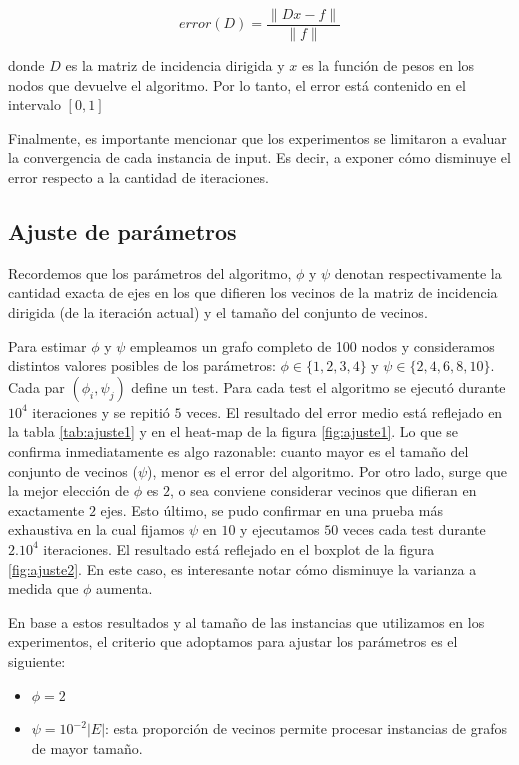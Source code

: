 \documentclass[conference,compsoc,a4paper]{IEEEtran}
\begin{document}
$$error(D) = \frac{\|Dx-f\|}{\|f\|}$$

donde $D$ es la matriz de incidencia dirigida y $x$ es la función de 
pesos en los nodos que devuelve el algoritmo. Por lo tanto, el error 
está contenido en el intervalo $[0,1]$

\smallskip

Finalmente, es importante mencionar que los experimentos se limitaron a 
evaluar la convergencia de cada instancia de input. Es decir, a exponer 
cómo disminuye el error respecto a la cantidad de iteraciones.

\subsection{Ajuste de parámetros}

Recordemos que los parámetros del algoritmo, $\phi$ y $\psi$ denotan 
respectivamente la cantidad exacta de ejes en los que difieren los 
vecinos de la matriz de incidencia dirigida (de la iteración actual) y 
el tamaño del conjunto de vecinos.

\smallskip

Para estimar $\phi$ y $\psi$ empleamos un grafo completo de 100 
nodos y consideramos distintos valores posibles de los parámetros: 
$\phi \in \{1,2,3,4\}$ y $\psi \in \{2,4,6,8,10\}$. Cada par 
$(\phi_i, \psi_j)$ define un test. Para cada test el algoritmo se 
ejecutó durante $10^4$ iteraciones y se repitió $5$ veces. El resultado 
del error medio está reflejado en la tabla \ref{tab:ajuste1} y en el 
heat-map de la figura \ref{fig:ajuste1}. Lo que se confirma 
inmediatamente es algo razonable: cuanto mayor es el tamaño del 
conjunto de vecinos ($\psi$), menor es el error del algoritmo. Por 
otro lado, surge que la mejor elección de $\phi$ es $2$, o sea 
conviene considerar vecinos que difieran en exactamente $2$ ejes. Esto 
último, se pudo confirmar en una prueba más exhaustiva en la cual 
fijamos $\psi$ en $10$ y ejecutamos $50$ veces cada test durante 
$2 . 10^4$ iteraciones. El resultado está reflejado en el boxplot de la 
figura \ref{fig:ajuste2}. En este caso, es interesante notar cómo 
disminuye la varianza a medida que $\phi$ aumenta.

\smallskip

En base a estos resultados y al tamaño de las instancias que utilizamos 
en los experimentos, el criterio que adoptamos para ajustar los 
parámetros es el siguiente:

\begin{itemize}
	\item $\phi = 2$
	\item $\psi = 10^{-2} |E|$: esta proporción de vecinos permite 
	procesar instancias de grafos de mayor tamaño.
\end{itemize}
\end{document}
